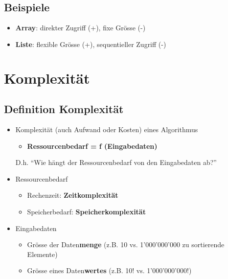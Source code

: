 \subsection{Beispiele}
\begin{itemize}
    \item \textbf{Array}: direkter Zugriff (+), fixe Grösse (-)
    \item \textbf{Liste}: flexible Grösse (+), sequentieller Zugriff (-)
\end{itemize}

\section{Komplexität}
\subsection{Definition Komplexität}
\begin{itemize}
    \item Komplexität (auch Aufwand oder Kosten) eines Algorithmus
    \begin{itemize}
        \item \textbf{Ressourcenbedarf = f (Eingabedaten)}
    \end{itemize}
    \subitem D.h. "`Wie hängt der Ressourcenbedarf von den Eingabedaten ab?"'
    \item Ressourcenbedarf
    \begin{itemize}
        \item Rechenzeit: \textbf{Zeitkomplexität}
        \item Speicherbedarf: \textbf{Speicherkomplexität}
    \end{itemize}
    \item Eingabedaten
    \begin{itemize}
        \item Grösse der Daten\textbf{menge} (z.B. 10 vs. 1'000'000'000 zu sortierende Elemente)
        \item Grösse eines Daten\textbf{wertes} (z.B. 10! vs. 1'000'000'000!)
    \end{itemize}
\end{itemize}

